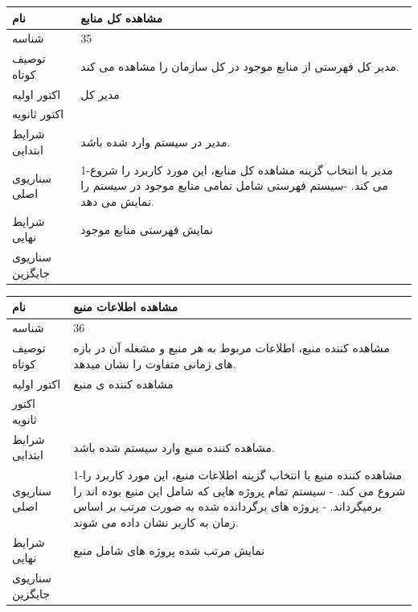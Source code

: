 \newpage

\begin{tabular}{|p{2cm}|p{10cm}|}
\hline
نام
&
مشاهده کل منابع
\\
\hline
شناسه
&
35
\\
\hline
توصیف کوتاه
&
مدیر کل فهرستی از منابع موجود در کل سازمان را مشاهده می کند.
\\
\hline
اکتور اولیه
&
مدیر کل
\\
\hline
اکتور ثانویه
&

\\
\hline
شرایط ابتدایی
&
مدیر در سیستم وارد شده باشد.
\\
\hline
سناریوی اصلی
&
1-مدیر با انتخاب گزینه مشاهده کل منابع، این مورد کاربرد را شروع می کند.
\newline
2-سیستم فهرستی شامل تمامی منابع موجود در سیستم را نمایش می دهد.
\\
\hline
شرایط نهایی
&
نمایش فهرستی منابع موجود
\\
\hline
سناریوی جایگزین
&

\\
\hline
\end{tabular}

\vspace{2cm}

\begin{tabular}{|p{2cm}|p{10cm}|}
\hline
نام
&
مشاهده اطلاعات منبع
\\
\hline
شناسه
&
36
\\
\hline
توصیف کوتاه
&
مشاهده کننده منبع، اطلاعات مربوط به هر منبع و مشغله آن در بازه های زمانی متفاوت را نشان میدهد.
\\
\hline
اکتور اولیه
&
مشاهده کننده ی منبع
\\
\hline
اکتور ثانویه
&

\\
\hline
شرایط ابتدایی
&
مشاهده کننده منبع وارد سیستم شده باشد.
\\
\hline
سناریوی اصلی
&
1-مشاهده کننده منبع با انتخاب گزینه اطلاعات منبع، این مورد کاربرد را شروع می کند.
\newline
2- سیستم تمام پروژه هایی که شامل این منبع بوده اند را برمیگرداند.
\newline
3- پروژه های برگردانده شده به صورت مرتب بر اساس زمان به کاربر نشان داده می شوند.
\\
\hline
شرایط نهایی
&
نمایش مرتب شده پروژه های شامل منبع
\\
\hline
سناریوی جایگزین
&

\\
\hline
\end{tabular}

